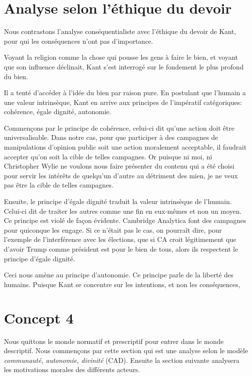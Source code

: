 \documentclass[11pt]{article}
\newcommand{\philnewpage}{}
\begin{document}
\philnewpage
\section{Analyse selon l'éthique du devoir}

Nous contrastons l'analyse conséquentialiste avec l'éthique du devoir de Kant,
pour qui les conséquences n'ont pas d'importance.

Voyant la religion comme la chose qui pousse les gens à faire le bien, et voyant
que son influence déclinait, Kant s'est interrogé sur le fondement le plus
profond du bien.

Il a tenté d'accéder à l'idée du bien par raison pure.  En postulant que
l'humain a une valeur intrinsèque, Kant en arrive aux principes de l'impératif
catégoriques: cohérence, égale dignité, autonomie.

Commençons par le principe de cohérence, celui-ci dit qu'une action doit être
universalisable.  Dans notre cas, pour que participer à des campagnes de
manipulations d'opinion public soit une action moralement acceptable, il
faudrait accepter qu'on soit la cible de telles campagnes.  Or puisque ni moi,
ni Christopher Wylie ne voulons nous faire présenter du contenu qui a été choisi
pour servir les intérêts de quelqu'un d'autre au détriment des mien, je ne veux
pas être la cible de telles campagnes.

Ensuite, le principe d'égale dignité traduit la valeur intrinsèque de l'humain.
Celui-ci dit de traiter les autres comme une fin en eux-mêmes et non un moyen.
Ce principe est violé de façon évidente.  Cambridge Analytica font des campagnes
pour quiconque les engage.  Si ce n'était pas le cas, on pourraît dire, pour
l'exemple de l'interférence avec les élections, que si CA croit légitimement que d'avoir
Trump comme président est pour le bien de tous, alors ils respectent le principe
d'égale dignité.

Ceci nous amène au principe d'autonomie.  Ce principe parle de la liberté des
humains.  Puisque Kant se concentre sur les intentions, et non les conséquences,
\philnewpage
\section{Concept 4}

Nous quittons le monde normatif et prescriptif pour entrer dans le monde
descriptif.  Nous commençons par cette section qui est une analyse selon le
modèle \emph{communauté, autonomie, divinité} (CAD).  Ensuite la section suivante analysera
les motivations morales des différents acteurs.
\end{document}
